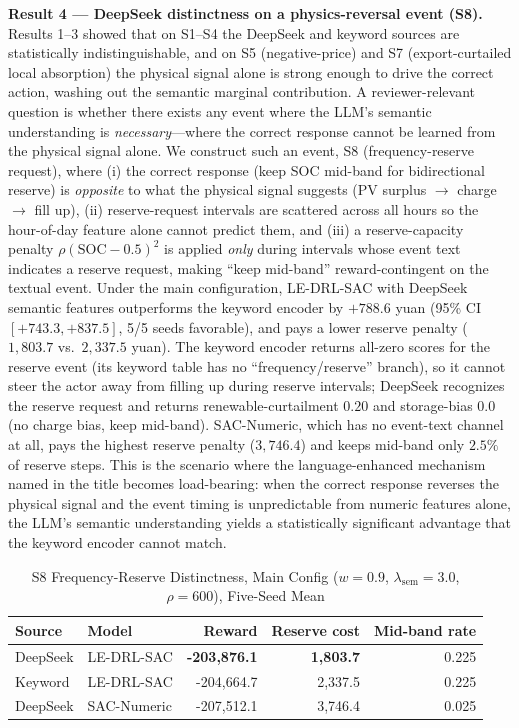 \textbf{Result 4 --- DeepSeek distinctness on a physics-reversal event (S8).}
Results 1--3 showed that on S1--S4 the DeepSeek and keyword sources are
statistically indistinguishable, and on S5 (negative-price) and S7
(export-curtailed local absorption) the physical signal alone is strong enough
to drive the correct action, washing out the semantic marginal contribution.
A reviewer-relevant question is whether there exists any event where the LLM's
semantic understanding is \emph{necessary}---where the correct response cannot be
learned from the physical signal alone. We construct such an event, S8
(frequency-reserve request), where (i) the correct response (keep SOC mid-band
for bidirectional reserve) is \emph{opposite} to what the physical signal
suggests (PV surplus $\to$ charge $\to$ fill up), (ii) reserve-request intervals
are scattered across all hours so the hour-of-day feature alone cannot predict
them, and (iii) a reserve-capacity penalty $\rho(\mathrm{SOC}-0.5)^2$ is applied
\emph{only} during intervals whose event text indicates a reserve request, making
``keep mid-band'' reward-contingent on the textual event. Under the main
configuration, LE-DRL-SAC with DeepSeek semantic features outperforms the keyword
encoder by $+788.6$ yuan (95\% CI $[+743.3, +837.5]$, 5/5 seeds favorable), and
pays a lower reserve penalty ($1{,}803.7$ vs.\ $2{,}337.5$ yuan). The keyword
encoder returns all-zero scores for the reserve event (its keyword table has no
``frequency/reserve'' branch), so it cannot steer the actor away from filling up
during reserve intervals; DeepSeek recognizes the reserve request and returns
renewable-curtailment $0.20$ and storage-bias $0.0$ (no charge bias, keep
mid-band). SAC-Numeric, which has no event-text channel at all, pays the highest
reserve penalty ($3{,}746.4$) and keeps mid-band only $2.5\%$ of reserve steps.
This is the scenario where the language-enhanced mechanism named in the title
becomes load-bearing: when the correct response reverses the physical signal and
the event timing is unpredictable from numeric features alone, the LLM's
semantic understanding yields a statistically significant advantage that the
keyword encoder cannot match.

\begin{table}[t!]
\caption{S8 Frequency-Reserve Distinctness, Main Config ($w=0.9$, $\lambda_{\mathrm{sem}}=3.0$, $\rho=600$), Five-Seed Mean}
\label{tab:m5_s8}
\centering
\begin{tabular}{llrrr}
\toprule
\textbf{Source} & \textbf{Model} & \textbf{Reward} & \textbf{Reserve cost} & \textbf{Mid-band rate} \\
\midrule
DeepSeek & LE-DRL-SAC & \textbf{-203,876.1} & \textbf{1,803.7} & 0.225 \\
Keyword & LE-DRL-SAC & -204,664.7 & 2,337.5 & 0.225 \\
DeepSeek & SAC-Numeric & -207,512.1 & 3,746.4 & 0.025 \\
\bottomrule
\end{tabular}
\end{table}

